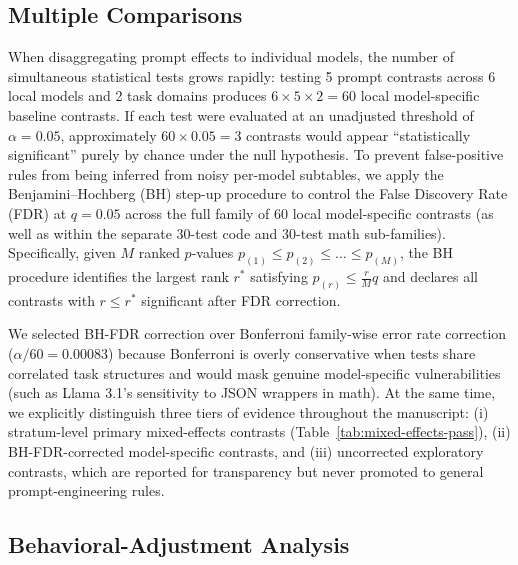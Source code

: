 \documentclass[a4paper,fleqn]{cas-sc}
\begin{document}
\subsection{Multiple Comparisons}\label{multiple-comparisons}

When disaggregating prompt effects to individual models, the number of simultaneous statistical tests grows rapidly: testing 5 prompt contrasts across 6 local models and 2 task domains produces $6 \times 5 \times 2 = 60$ local model-specific baseline contrasts. If each test were evaluated at an unadjusted threshold of $\alpha = 0.05$, approximately $60 \times 0.05 = 3$ contrasts would appear ``statistically significant'' purely by chance under the null hypothesis. To prevent false-positive rules from being inferred from noisy per-model subtables, we apply the Benjamini--Hochberg (BH) step-up procedure to control the False Discovery Rate (FDR) at $q = 0.05$ across the full family of 60 local model-specific contrasts (as well as within the separate 30-test code and 30-test math sub-families). Specifically, given $M$ ranked $p$-values $p_{(1)} \le p_{(2)} \le \dots \le p_{(M)}$, the BH procedure identifies the largest rank $r^*$ satisfying $p_{(r)} \le \frac{r}{M} q$ and declares all contrasts with $r \le r^*$ significant after FDR correction.

We selected BH-FDR correction over Bonferroni family-wise error rate correction ($\alpha / 60 = 0.00083$) because Bonferroni is overly conservative when tests share correlated task structures and would mask genuine model-specific vulnerabilities (such as Llama 3.1's sensitivity to JSON wrappers in math). At the same time, we explicitly distinguish three tiers of evidence throughout the manuscript: (i) stratum-level primary mixed-effects contrasts (Table~\ref{tab:mixed-effects-pass}), (ii) BH-FDR-corrected model-specific contrasts, and (iii) uncorrected exploratory contrasts, which are reported for transparency but never promoted to general prompt-engineering rules.

\subsection{Behavioral-Adjustment Analysis}\label{mediation-and-behavioral-controls}
\end{document}
